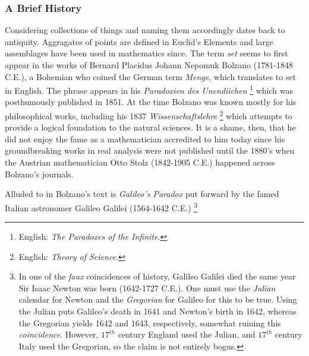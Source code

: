         \subsubsection{A Brief History}
            Considering collections of things and naming them accordingly dates
            back to antiquity. Aggragates of points are defined in Euclid's
            Elements and large assemblages have been used in mathematics since.
            The term \textit{set} seems to first appear in the works of
            Bernard Placidus Johann Nepomuk Bolzano (1781-1848 C.E.), a Bohemian
            who coined the German term \textit{Menge}, which translates to set
            in English. The phrase appears in his
            \textit{Paradoxien des Unendiichen}%
            \footnote{%
                English: \textit{The Paradoxes of the Infinite}.
            }
            which was posthumously published in 1851. At the time Bolzano was
            known mostly for his philosophical works, including his 1837
            \textit{Wissenschaftslehre}%
            \footnote{%
                English: \textit{Theory of Science}.
            }
            which attempts to provide a logical foundation to the natural
            sciences. It is a shame, then, that he did not enjoy the fame as a
            mathematician accredited to him today since his groundbreaking works
            in real analysis were not published until the 1880's when the
            Austrian mathematician Otto Stolz
            (1842-1905 C.E.) happened across Bolzano's journals.
            \par\hfill\par
            Alluded to in Bolzano's text is \textit{Galileo's Paradox}%
             put forward by
            the famed Italian astronomer Galileo Galilei
            (1564-1642 C.E.)%
            \footnote{%
                In one of the \textit{faux} coincidences of history, Galileo
                Galilei died the same year Sir Isaac Newton was born
                (1642-1727 C.E.). One must use the \textit{Julian} calendar for
                Newton and the \textit{Gregorian} for Galileo for this to be
                true. Using the Julian puts Galileo's death in 1641 and Newton's
                birth in 1642, whereas the Gregorian yields 1642 and 1643,
                respectively, somewhat ruining this \textit{coincidence}.
                However, $17^{th}$ century England used the Julian, and
                $17^{th}$ century Italy used the Gregorian, so
                the claim is not entirely bogus.
            }
